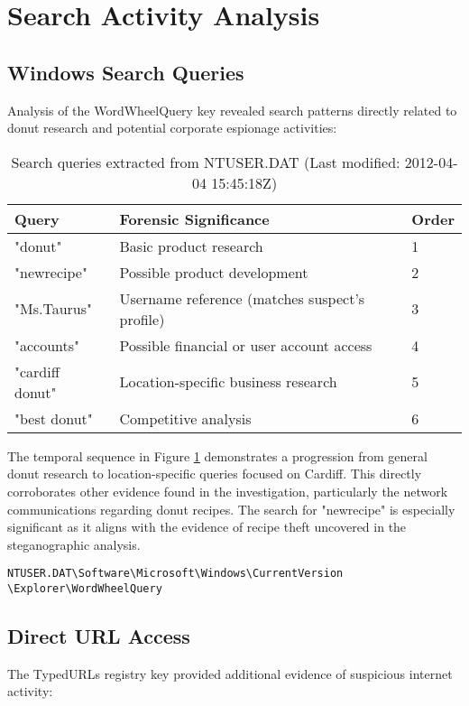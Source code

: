 \section{Search Activity Analysis}
\subsection{Windows Search Queries}
Analysis of the WordWheelQuery key revealed search patterns directly related to donut research and potential corporate espionage activities:

\begin{table}[htbp]
    \centering
    \begin{tabular}{|l|p{10cm}|l|}
        \hline
        \textbf{Query} & \textbf{Forensic Significance} & \textbf{Order} \\
        \hline
        "donut" & Basic product research & 1 \\
        \hline
        "newrecipe" & Possible product development & 2 \\
        \hline
        "Ms.Taurus" & Username reference (matches suspect's profile) & 3 \\
        \hline
        "accounts" & Possible financial or user account access & 4 \\
        \hline
        "cardiff donut" & Location-specific business research & 5 \\
        \hline
        "best donut" & Competitive analysis & 6 \\
        \hline
    \end{tabular}
    \caption{Search queries extracted from NTUSER.DAT (Last modified: 2012-04-04 15:45:18Z)}
    \label{tab:search_queries}
\end{table}

The temporal sequence in Figure \ref{tab:search_queries} demonstrates a progression from general donut research to location-specific queries focused on Cardiff. This directly corroborates other evidence found in the investigation, particularly the network communications regarding donut recipes. The search for "newrecipe" is especially significant as it aligns with the evidence of recipe theft uncovered in the steganographic analysis.

\texttt{\small NTUSER.DAT\textbackslash Software\textbackslash Microsoft\textbackslash Windows\textbackslash CurrentVersion\\\textbackslash Explorer\textbackslash WordWheelQuery}

\subsection{Direct URL Access}
The TypedURLs registry key provided additional evidence of suspicious internet activity:


